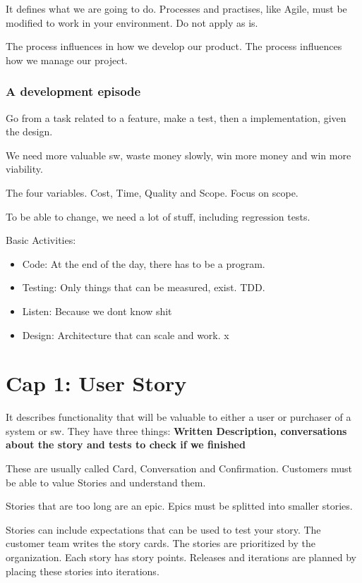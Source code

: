 \documentclass[a4paper,12pt]{article}
\begin{document}
It defines what we are going to do. Processes and practises, like Agile, must be modified to work in your environment. Do not apply as is.

The process influences in how we develop our product. The process influences how we manage our project. 

\subsubsection{A development episode}

Go from a task related to a feature, make a test, then a implementation, given the design.

We need more valuable sw, waste money slowly, win more money and win more viability.

The four variables. Cost, Time, Quality and Scope. Focus on scope.

To be able to change, we need a lot of stuff, including regression tests.

Basic Activities:

\begin{itemize}
\item Code: At the end of the day, there has to be a program.
\item Testing: Only things that can be measured, exist. TDD. 
\item Listen: Because we dont know shit
  \item Design: Architecture that can scale and work. x
\end{itemize}

\section{ Cap 1: User Story}
It describes functionality that will be valuable to either a user or purchaser of a system or sw. They have three things: \textbf{Written Description, conversations about the story and tests to check if we finished}

These are usually called Card, Conversation and Confirmation. Customers must be able to value Stories and understand them.

Stories that are too long are an epic. Epics must be splitted into smaller stories.

Stories can include expectations that can be used to test your story. The customer team writes the story cards. The stories are prioritized by the organization. Each story has story points. Releases and iterations are planned by placing these stories into iterations.
\end{document}
